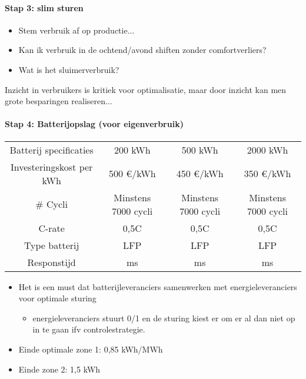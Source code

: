 \documentclass[12pt]{article}
\begin{document}
\paragraph{Stap 3: slim sturen}
\begin{itemize}
    \item Stem verbruik af op productie...
    \item Kan ik verbruik in de ochtend/avond shiften zonder comfortverliers?
    \item Wat is het sluimerverbruik?
\end{itemize}
Inzicht in verbruikers is kritiek voor optimalisatie, maar door inzicht kan men grote besparingen realiseren...
\paragraph{Stap 4: Batterijopslag (voor eigenverbruik)}
\begin{center}
    \begin{adjustbox}{width=\textwidth}
    \begin{tabular}{|c|c|c|c|}
    Batterij specificaties & 200 kWh & 500 kWh & 2000 kWh \\ 
    Investeringskost per kWh & 500 €/kWh & 450 €/kWh & 350 €/kWh \\  
    \# Cycli & Minstens 7000 cycli & Minstens 7000 cycli & Minstens 7000 cycli \\
    C-rate & 0,5C & 0,5C& 0,5C \\ 
    Type batterij & LFP & LFP & LFP\\
    Responstijd & ms & ms & ms 
    \end{tabular}
\end{adjustbox}
\end{center}
\begin{itemize}
    \item[] Het is een must dat batterijleveranciers samenwerken met energieleveranciers voor optimale sturing\begin{itemize}
        \item energieleveranciers stuurt 0/1 en de sturing kiest er om er al dan niet op in te gaan ifv controlestrategie.
    \end{itemize}
\end{itemize}
\begin{itemize}
    \item Einde optimale zone 1: 0,85 kWh/MWh 
    \item Einde zone 2: 1,5 kWh
\end{itemize}
\end{document}
